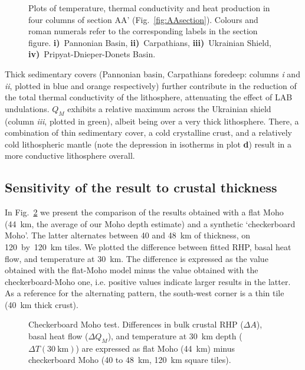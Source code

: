{\begin{figure}
	\begin{adjustbox}{center}
	\end{adjustbox}
	\caption{Plots of temperature, thermal conductivity and heat production in four columns of section AA' (Fig.~\ref{fig:AAsection}). Colours and roman numerals refer to the corresponding labels in the section figure.
	\textbf{i)}~Pannonian Basin, 
	\textbf{ii)}~Carpathians, 
	\textbf{iii)}~Ukrainian Shield, 
	\textbf{iv)}~Pripyat-Dnieper-Donets Basin.}
	\label{fig:AAsectionCols}
\end{figure}

Thick sedimentary covers (Pannonian basin, Carpathians foredeep: columns \textit{i} and \textit{ii}, plotted in blue and orange respectively) further contribute in the reduction of the total thermal conductivity of the lithosphere, attenuating the effect of LAB undulations.
$Q_M$ exhibits a relative maximum across the Ukrainian shield (column \textit{iii}, plotted in green), albeit being over a very thick lithosphere.
There, a combination of thin sedimentary cover, a cold crystalline crust, and a relatively cold lithospheric mantle (note the depression in isotherms in plot \textbf{d}) result in a more conductive lithosphere overall.

\subsection{Sensitivity of the result to crustal thickness}
\label{ss:Appl:DiscTherm:Sens}

In Fig.~\ref{fig:CompCheckMoho} we present the comparison of the results obtained with a flat Moho (44~km, the average of our Moho depth estimate) and a synthetic `checkerboard Moho'.
The latter alternates between 40 and 48~km of thickness, on 120~by~120~km tiles.
We plotted the difference between fitted RHP, basal heat flow, and temperature at 30~km.
The difference is expressed as the value obtained with the flat-Moho model minus the value obtained with the checkerboard-Moho one, i.e. positive values indicate larger results in the latter.
As a reference for the alternating pattern, the south-west corner is a thin tile (40~km thick crust).

\begin{figure}
	\begin{adjustbox}{center}
	\end{adjustbox}
	\caption{Checkerboard Moho test. Differences in bulk crustal RHP ($\Delta A$), basal heat flow ($\Delta Q_M$), and temperature at 30~km depth ($\Delta T(30~\mathrm{km})$) are expressed as flat Moho (44~km) minus checkerboard Moho (40 to 48~km, 120~km square tiles).}
	\label{fig:CompCheckMoho}
\end{figure}

}
